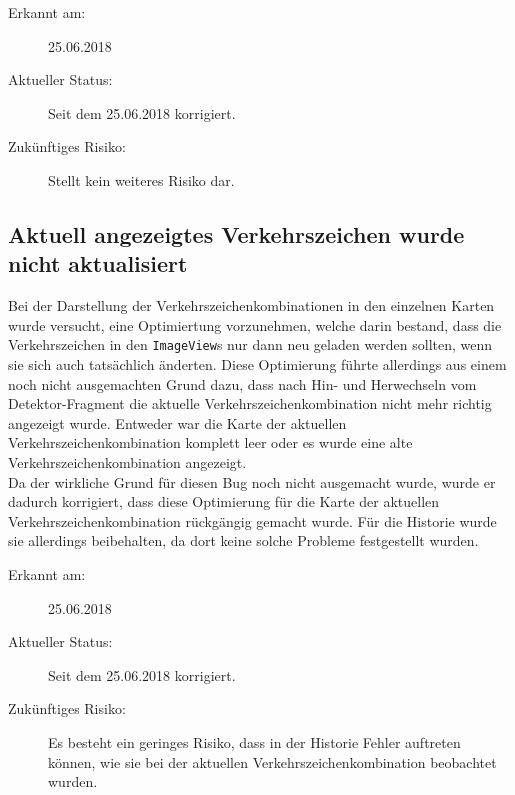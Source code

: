 \documentclass[12pt,a4paper,ngerman,enabledeprecatedfontcommands]{scrreprt}
\begin{document}
\begin{description}

    \item[Erkannt am:] 25.06.2018
    
    \item[Aktueller Status:] Seit dem 25.06.2018 korrigiert.
    
    \item[Zukünftiges Risiko:] Stellt kein weiteres Risiko dar.
    
\end{description}
\smallskip

\subsection{Aktuell angezeigtes Verkehrszeichen wurde nicht aktualisiert}
Bei der Darstellung der \gls{Verkehrszeichenkombination}en in den einzelnen Karten wurde versucht, eine Optimiertung vorzunehmen, welche darin bestand, dass die Verkehrszeichen in den \texttt{ImageView}s nur dann neu geladen werden sollten, wenn sie sich auch tatsächlich änderten. Diese \glqq{}Optimierung\grqq{} führte allerdings aus einem noch nicht ausgemachten Grund dazu, dass nach Hin- und Herwechseln vom Detektor-Fragment die aktuelle \gls{Verkehrszeichenkombination} nicht mehr richtig angezeigt wurde. Entweder war die Karte der aktuellen \gls{Verkehrszeichenkombination} komplett leer oder es wurde eine alte \gls{Verkehrszeichenkombination} angezeigt.\\
Da der wirkliche Grund für diesen Bug noch nicht ausgemacht wurde, wurde er dadurch korrigiert, dass diese \glqq{}Optimierung\grqq{} für die Karte der aktuellen \gls{Verkehrszeichenkombination} rückgängig gemacht wurde. Für die Historie wurde sie allerdings beibehalten, da dort keine solche Probleme festgestellt wurden.

\begin{description}

    \item[Erkannt am:] 25.06.2018
    
    \item[Aktueller Status:] Seit dem 25.06.2018 korrigiert.
    
    \item[Zukünftiges Risiko:] Es besteht ein geringes Risiko, dass in der Historie Fehler auftreten können, wie sie bei der aktuellen \gls{Verkehrszeichenkombination} beobachtet wurden.
    
\end{description}
\smallskip
\end{document}
